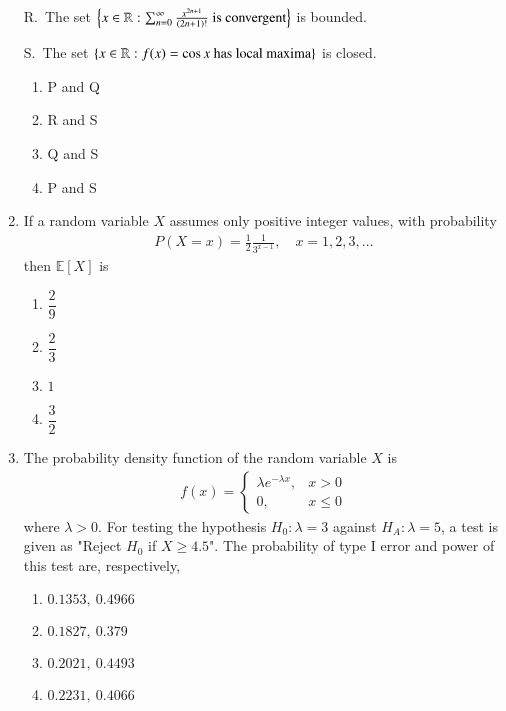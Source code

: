 \documentclass[journal]{IEEEtran}
\numberwithin{equation}{enumi}
\numberwithin{figure}{enumi}
\begin{document}
\begin{enumerate}
R.\ The set $\left\{x \in \mathbb{R}: \sum_{n=0}^{\infty} \frac{x^{2n+1}}{(2n+1)!}\ \text{is convergent}\right\}$ is bounded.

S.\ The set $\left\{x \in \mathbb{R}: f(x) = \cos x\ \text{has local maxima}\right\}$ is closed.
\hfill{}
\begin{multicols}{2}
\begin{enumerate}
\item P and Q
\item R and S
\item Q and S
\item P and S
\end{enumerate}
\end{multicols}

\item
If a random variable $X$ assumes only positive integer values, with probability
\begin{align}
P(X=x) = \frac{1}{2}\frac{1}{3^{x-1}},\quad x=1,2,3,\ldots
\end{align}
then $\mathbb{E}[X]$ is
\hfill{}
\begin{multicols}{4}
\begin{enumerate}
\item $\dfrac{2}{9}$
\item $\dfrac{2}{3}$
\item $1$
\item $\dfrac{3}{2}$
\end{enumerate}
\end{multicols}

\item
The probability density function of the random variable $X$ is
\begin{align}
f(x)=
\begin{cases}
\lambda e^{-\lambda x},& x>0\\
0,& x \leq 0
\end{cases}
\end{align}
where $\lambda>0$. For testing the hypothesis $H_0: \lambda=3$ against $H_A: \lambda=5$, a test is given as "Reject $H_0$ if $X \geq 4.5$". The probability of type I error and power of this test are, respectively,
\hfill{}
\begin{multicols}{2}
\begin{enumerate}
\item $0.1353,\ 0.4966$
\item $0.1827,\ 0.379$
\item $0.2021,\ 0.4493$
\item $0.2231,\ 0.4066$
\end{enumerate}
\end{multicols}


\end{enumerate}
\end{document}
